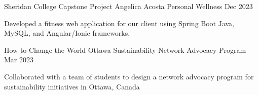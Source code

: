 \begin{cventries}
  \cventry
    {Sheridan College Capstone Project}
    {Angelica Acosta Personal Wellness}
    {}
    {Dec 2023}
    {
      \begin{cvitems}
        \item {Developed a fitness web application for our client using Spring Boot Java, MySQL, and Angular/Ionic frameworks.}
        \end{cvitems}
    }
  \cventry
    {How to Change the World}
    {Ottawa Sustainability Network Advocacy Program}
    {}
    {Mar 2023}
    {
      \begin{cvitems}
        \item {Collaborated with a team of students to design a network advocacy program for sustainability initiatives in Ottawa, Canada}      
        \end{cvitems}
    }
\end{cventries}